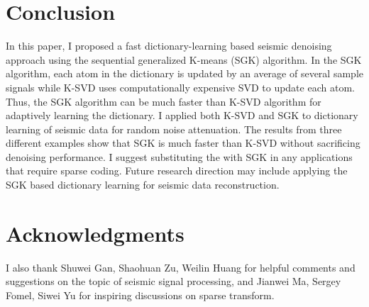 

\section{Conclusion}
In this paper, I proposed a fast dictionary-learning based seismic denoising approach using the  sequential generalized K-means (SGK) algorithm. In the SGK algorithm, each atom in the dictionary is updated by an average of several sample signals while K-SVD uses computationally expensive SVD to update each atom. Thus, the SGK algorithm can be much faster than K-SVD algorithm for adaptively learning the dictionary. I applied both K-SVD and SGK to dictionary learning of seismic data for random noise attenuation. The results from three different examples show that SGK is much faster than K-SVD without sacrificing  denoising performance. I suggest substituting the  with SGK in any applications that require sparse coding. Future research direction may include applying the SGK based dictionary learning for  seismic data reconstruction.  


\section{Acknowledgments}
 I also thank Shuwei Gan, Shaohuan Zu, Weilin Huang for helpful comments and suggestions on the topic of seismic signal processing, and Jianwei Ma, Sergey Fomel, Siwei Yu for inspiring discussions on sparse transform. 

